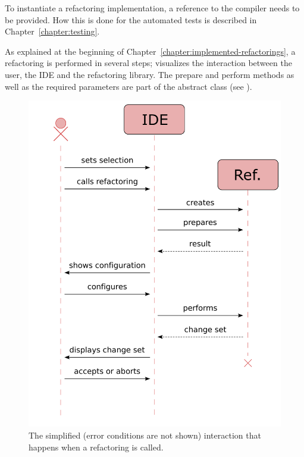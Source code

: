 \documentclass[10pt,a4paper,oneside]{scrreprt}
\begin{document}
To instantiate a refactoring implementation, a reference to the compiler needs to be provided. How this is done for the automated tests is described in Chapter~\vref{chapter:testing}.

As explained at the beginning of Chapter~\vref{chapter:implemented-refactorings}, a refactoring is performed in several steps;  visualizes the interaction between the user, the IDE and the refactoring library. The prepare and perform methods as well as the required parameters are part of the  abstract class (see ).

\begin{figure}
  \centering
  \includegraphics[width=0.9\linewidth]{refactoring-sequence.pdf}
  \caption{The simplified (error conditions are not shown) interaction that happens when a refactoring is called.}
  \label{figure:refactoring-sequence}
\end{figure}
\end{document}

